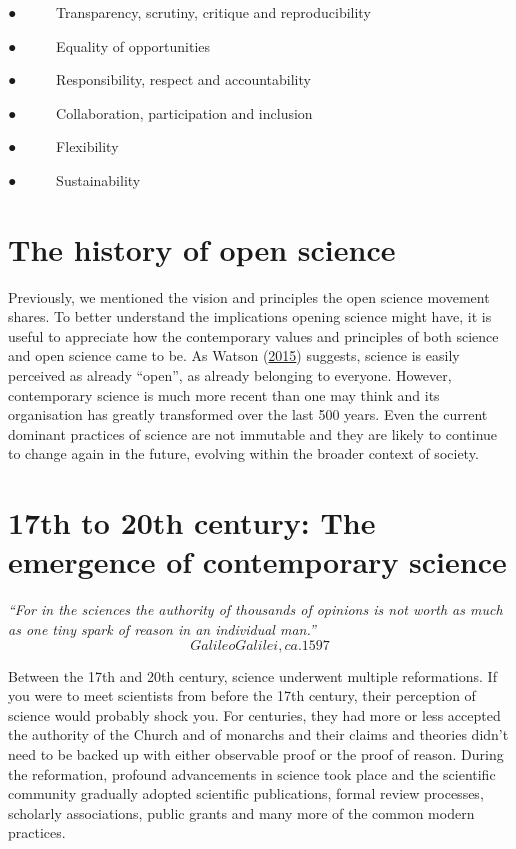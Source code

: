 \documentclass[
]{book}
\begin{document}
● ~ ~ ~ Transparency, scrutiny, critique and reproducibility

● ~ ~ ~ Equality of opportunities

● ~ ~ ~ Responsibility, respect and accountability

● ~ ~ ~ Collaboration, participation and inclusion

● ~ ~ ~ Flexibility

● ~ ~ ~ Sustainability

\hypertarget{the-history-of-open-science}{%
\section{The history of open science}\label{the-history-of-open-science}}

Previously, we mentioned the vision and principles the open science movement shares. To better understand the implications opening science might have, it is useful to appreciate how the contemporary values and principles of both science and open science came to be. As Watson (\href{https://genomebiology.biomedcentral.com/articles/10.1186/s13059-015-0669-2}{2015}) suggests, science is easily perceived as already ``open'', as already belonging to everyone. However, contemporary science is much more recent than one may think and its organisation has greatly transformed over the last 500 years. Even the current dominant practices of science are not immutable and they are likely to continue to change again in the future, evolving within the broader context of society.

\hypertarget{th-to-20th-century-the-emergence-of-contemporary-science}{%
\section{17th to 20th century: The emergence of contemporary science}\label{th-to-20th-century-the-emergence-of-contemporary-science}}

\emph{``For in the sciences the authority of thousands of opinions is not worth as much as one tiny spark of reason in an individual man.''} \[Galileo Galilei, ca. 1597\]

Between the 17th and 20th century, science underwent multiple reformations. If you were to meet scientists from before the 17th century, their perception of science would probably shock you. For centuries, they had more or less accepted the authority of the Church and of monarchs and their claims and theories didn't need to be backed up with either observable proof or the proof of reason. During the reformation, profound advancements in science took place and the scientific community gradually adopted scientific publications, formal review processes, scholarly associations, public grants and many more of the common modern practices.
\end{document}
